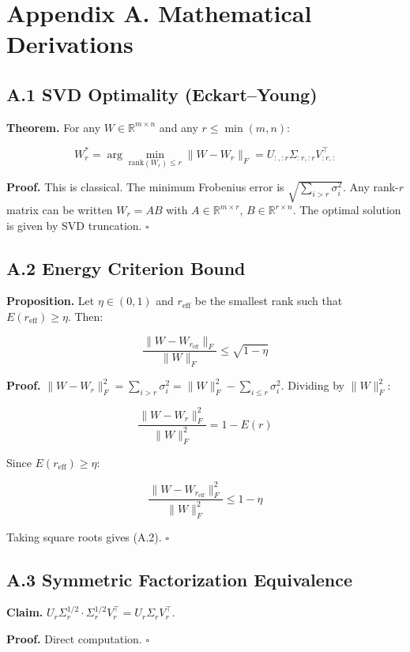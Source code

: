 
\section{Appendix A. Mathematical Derivations}

\subsection{A.1 SVD Optimality (Eckart--Young)}

\textbf{Theorem.} For any $W \in \mathbb{R}^{m \times n}$ and any $r \leq \min(m, n)$:

\[
W_r^* = \arg\min_{\text{rank}(W_r) \leq r} \|W - W_r\|_F = U_{:, :r} \Sigma_{:r, :r} V_{:r, :}^\top
\tag{A.1}
\]

\textbf{Proof.} This is classical. The minimum Frobenius error is 
$\sqrt{\sum_{i > r} \sigma_i^2}$. Any rank-$r$ matrix can be written 
$W_r = A B$ with $A \in \mathbb{R}^{m \times r}$, $B \in \mathbb{R}^{r \times n}$. 
The optimal solution is given by SVD truncation. $\square$

\subsection{A.2 Energy Criterion Bound}

\textbf{Proposition.} Let $\eta \in (0, 1)$ and $r_\text{eff}$ be the smallest 
rank such that $E(r_\text{eff}) \geq \eta$. Then:

\[
\frac{\|W - W_{r_\text{eff}}\|_F}{\|W\|_F} \leq \sqrt{1 - \eta}
\tag{A.2}
\]

\textbf{Proof.} $\|W - W_r\|_F^2 = \sum_{i > r} \sigma_i^2 = \|W\|_F^2 - \sum_{i \leq r} \sigma_i^2$. 
Dividing by $\|W\|_F^2$:

\[
\frac{\|W - W_r\|_F^2}{\|W\|_F^2} = 1 - E(r)
\tag{A.3}
\]

Since $E(r_\text{eff}) \geq \eta$:

\[
\frac{\|W - W_{r_\text{eff}}\|_F^2}{\|W\|_F^2} \leq 1 - \eta
\tag{A.4}
\]

Taking square roots gives (A.2). $\square$

\subsection{A.3 Symmetric Factorization Equivalence}

\textbf{Claim.} $U_r \Sigma_r^{1/2} \cdot \Sigma_r^{1/2} V_r^\top = U_r \Sigma_r V_r^\top$.

\textbf{Proof.} Direct computation. $\square$

